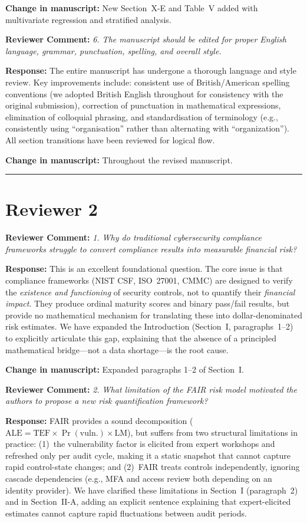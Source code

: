 \documentclass[11pt]{article}
\newcommand{\RC}[1]{\medskip\noindent\textbf{\color{reviewer}Reviewer Comment:} \textit{#1}\par\medskip}
\newcommand{\RE}[1]{\noindent\textbf{\color{response}Response:} #1\par}
\newcommand{\CH}[1]{\noindent\textbf{\color{change}Change in manuscript:} #1\par\medskip}
\begin{document}
\CH{New Section~X-E and Table~V added with multivariate regression and stratified analysis.}

\RC{6. The manuscript should be edited for proper English language, grammar, punctuation, spelling, and overall style.}

\RE{The entire manuscript has undergone a thorough language and style review. Key improvements include: consistent use of British/American spelling conventions (we adopted British English throughout for consistency with the original submission), correction of punctuation in mathematical expressions, elimination of colloquial phrasing, and standardisation of terminology (e.g., consistently using ``organisation'' rather than alternating with ``organization''). All section transitions have been reviewed for logical flow.}

\CH{Throughout the revised manuscript.}

\bigskip
\hrule
\bigskip

\section*{Reviewer 2}

\RC{1. Why do traditional cybersecurity compliance frameworks struggle to convert compliance results into measurable financial risk?}

\RE{This is an excellent foundational question. The core issue is that compliance frameworks (NIST CSF, ISO~27001, CMMC) are designed to verify the \emph{existence and functioning} of security controls, not to quantify their \emph{financial impact}. They produce ordinal maturity scores and binary pass/fail results, but provide no mathematical mechanism for translating these into dollar-denominated risk estimates. We have expanded the Introduction (Section~I, paragraphs~1--2) to explicitly articulate this gap, explaining that the absence of a principled mathematical bridge---not a data shortage---is the root cause.}

\CH{Expanded paragraphs 1--2 of Section~I.}

\RC{2. What limitation of the FAIR risk model motivated the authors to propose a new risk quantification framework?}

\RE{FAIR provides a sound decomposition ($\mathrm{ALE} = \mathrm{TEF} \times \Pr(\text{vuln.}) \times \mathrm{LM}$), but suffers from two structural limitations in practice: (1)~the vulnerability factor is elicited from expert workshops and refreshed only per audit cycle, making it a static snapshot that cannot capture rapid control-state changes; and (2)~FAIR treats controls independently, ignoring cascade dependencies (e.g., MFA and access review both depending on an identity provider). We have clarified these limitations in Section~I (paragraph~2) and in Section~II-A, adding an explicit sentence explaining that expert-elicited estimates cannot capture rapid fluctuations between audit periods.}
\end{document}
